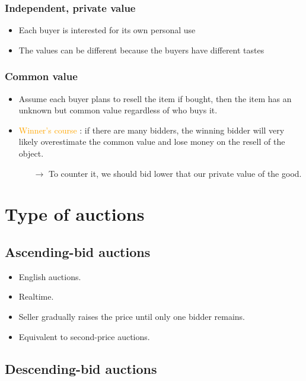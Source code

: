 \subsubsection{Independent, private value}

\begin{itemize}
\item Each buyer is interested for its own personal use
\item The values can be different because the buyers have different tastes
\end{itemize}

\subsubsection{Common value}

\begin{itemize}
\item Assume each buyer plans to resell the item if bought, then the item has an unknown but common value regardless of who buys it.
\item \textcolor{orange}{Winner's course} : if there are many bidders, the winning bidder will very likely overestimate the common value and lose money on the resell of the object.
	\begin{itemize}
	\item[$\rightarrow$] To counter it, we should bid lower that our private value of the good.
	\end{itemize}
\end{itemize}

\section{Type of auctions}

\subsection{Ascending-bid auctions}

\begin{itemize}
\item English auctions.
\item Realtime.
\item Seller gradually raises the price until only one bidder remains.
\item Equivalent to second-price auctions.
\end{itemize}

\subsection{Descending-bid auctions}

